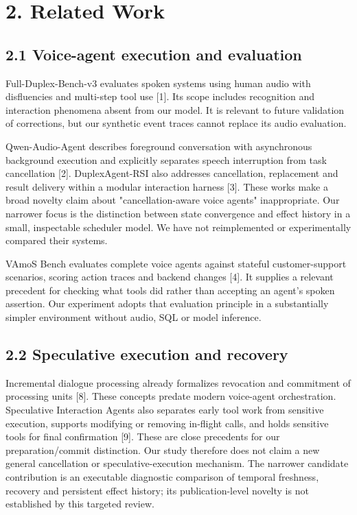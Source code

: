 \documentclass[10pt]{article}
\begin{document}
\section*{2. Related Work}

\subsection*{2.1 Voice-agent execution and evaluation}

Full-Duplex-Bench-v3 evaluates spoken systems using human audio with disfluencies and multi-step tool use [1]. Its scope includes recognition and interaction phenomena absent from our model. It is relevant to future validation of corrections, but our synthetic event traces cannot replace its audio evaluation.


Qwen-Audio-Agent describes foreground conversation with asynchronous background execution and explicitly separates speech interruption from task cancellation [2]. DuplexAgent-RSI also addresses cancellation, replacement and result delivery within a modular interaction harness [3]. These works make a broad novelty claim about "cancellation-aware voice agents" inappropriate. Our narrower focus is the distinction between state convergence and effect history in a small, inspectable scheduler model. We have not reimplemented or experimentally compared their systems.


VAmoS Bench evaluates complete voice agents against stateful customer-support scenarios, scoring action traces and backend changes [4]. It supplies a relevant precedent for checking what tools did rather than accepting an agent's spoken assertion. Our experiment adopts that evaluation principle in a substantially simpler environment without audio, SQL or model inference.


\subsection*{2.2 Speculative execution and recovery}

Incremental dialogue processing already formalizes revocation and commitment of processing units [8]. These concepts predate modern voice-agent orchestration. Speculative Interaction Agents also separates early tool work from sensitive execution, supports modifying or removing in-flight calls, and holds sensitive tools for final confirmation [9]. These are close precedents for our preparation/commit distinction. Our study therefore does not claim a new general cancellation or speculative-execution mechanism. The narrower candidate contribution is an executable diagnostic comparison of temporal freshness, recovery and persistent effect history; its publication-level novelty is not established by this targeted review.
\end{document}
